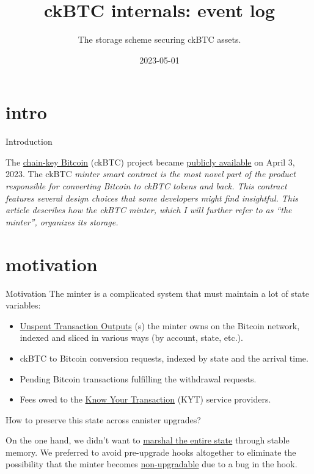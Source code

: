 \documentclass{article}
\title{ckBTC internals: event log}
\subtitle{The storage scheme securing ckBTC assets.}
\date{2023-05-01}
\begin{document}
\section{intro}{Introduction}
  
The \href{https://medium.com/dfinity/chain-key-bitcoin-a-decentralized-bitcoin-twin-ceb8f4ddf95e}{chain-key Bitcoin} (ckBTC) project became \href{https://twitter.com/dfinity/status/1642887821731004418}{publicly available} on April 3, 2023.
The ckBTC \em{minter} smart contract is the most novel part of the product responsible for converting Bitcoin to ckBTC tokens and back.
This contract features several design choices that some developers might find insightful.
This article describes how the ckBTC minter, which I will further refer to as ``the minter'', organizes its storage.

\section{motivation}{Motivation}
The minter is a complicated system that must maintain a lot of state variables:

\begin{itemize}
    \item
    \href{https://en.wikipedia.org/wiki/Unspent_transaction_output}{Unspent Transaction Outputs} (s) the minter owns on the Bitcoin network, indexed and sliced in various ways (by account, state, etc.).
    \item
    ckBTC to Bitcoin conversion requests, indexed by state and the arrival time.
    \item
    Pending Bitcoin transactions fulfilling the withdrawal requests.
    \item
    Fees owed to the \href{https://thepaypers.com/expert-opinion/know-your-transaction-kyt-the-key-to-combating-transaction-laundering--1246231}{Know Your Transaction} (KYT) service providers.
\end{itemize}

How to preserve this state across canister upgrades?

On the one hand, we didn't want to \href{/posts/11-ii-stable-memory.html#conventional-memory-management}{marshal the entire state} through stable memory.
We preferred to avoid pre-upgrade hooks altogether to eliminate the possibility that the minter becomes \href{/posts/01-effective-rust-canisters.html#upgrade-hook-panics}{non-upgradable} due to a bug in the hook.
\end{document}
